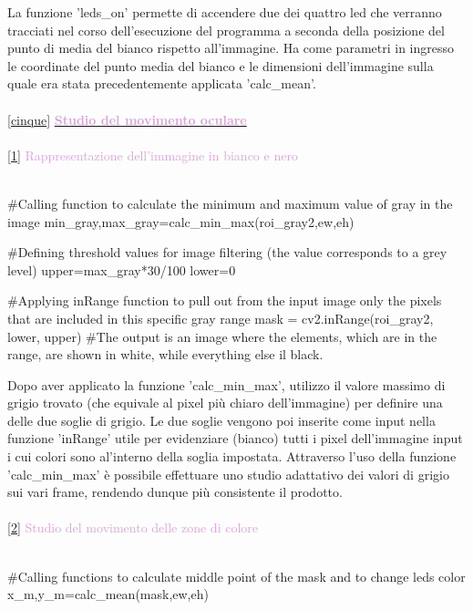 \documentclass[12pt]{article}
\begin{document}
{\vspace{1cm} La funzione 'leds\_on' permette di accendere due dei quattro led che verranno tracciati nel corso dell'esecuzione del programma a seconda della posizione del punto di media del bianco rispetto all'immagine. Ha come parametri in ingresso le coordinate del punto media del bianco e le dimensioni dell'immagine sulla quale era stata precedentemente applicata 'calc\_mean'.
\\
\\

\ref {cinque} \underline{\textbf{\textcolor{Plum}{Studio del movimento oculare}}}
\\
\\
\ref{1} \textcolor{Plum}{Rappresentazione dell'immagine in bianco e nero}
\\
\\
 \begin{codice}
 	#Calling function to calculate the minimum and maximum value of gray in the image
 	min_gray,max_gray=calc_min_max(roi_gray2,ew,eh)
 	
 	#Defining threshold values for image filtering (the value corresponds to a grey level)
 	upper=max_gray*30/100
 	lower=0
 	
 	
 	#Applying inRange function to pull out from the input image only the pixels that are included in this specific gray range 
 	mask = cv2.inRange(roi_gray2, lower, upper)
 	#The output is an image where the elements, which are in the range, are shown in white, while everything else il black.
 \end{codice}
 
 \vspace{1cm} Dopo aver applicato la funzione 'calc\_min\_max', utilizzo il valore massimo di grigio trovato (che equivale al pixel più chiaro dell'immagine) per definire una delle due soglie di grigio. Le due soglie vengono poi inserite come input nella funzione 'inRange' utile per evidenziare (bianco) tutti i pixel dell'immagine input i cui colori sono al'interno della soglia impostata. Attraverso l'uso della funzione 'calc\_min\_max' \`e possibile effettuare uno studio adattativo dei valori di grigio sui vari frame, rendendo dunque più consistente il prodotto.
 \\
 \\


\ref{2} \textcolor{Plum}{Studio del movimento delle zone di colore}
\\
\\
\begin{codice}
	#Calling functions to calculate middle point of the mask and to change leds color
	x_m,y_m=calc_mean(mask,ew,eh)
	

\end{codice}}
\end{document}
